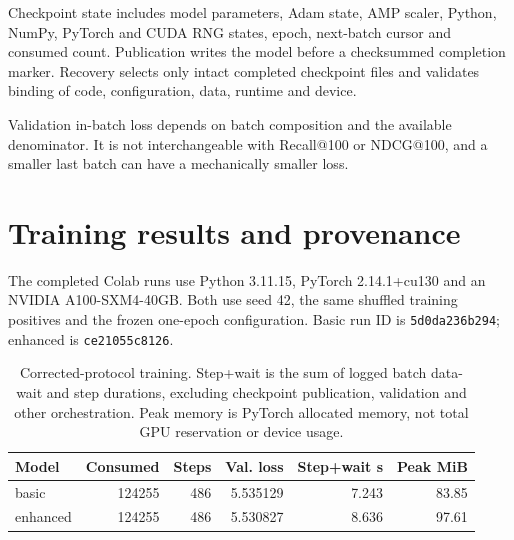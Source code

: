 \documentclass[11pt,a4paper]{article}
\begin{document}
Checkpoint state includes model parameters, Adam state, AMP scaler, Python, NumPy, PyTorch and CUDA RNG states, epoch, next-batch cursor and consumed count. Publication writes the model before a checksummed completion marker. Recovery selects only intact completed checkpoint files and validates binding of code, configuration, data, runtime and device.

Validation in-batch loss depends on batch composition and the available denominator. It is not interchangeable with Recall@100 or NDCG@100, and a smaller last batch can have a mechanically smaller loss.
\clearpage
\section{Training results and provenance}
The completed Colab runs use Python 3.11.15, PyTorch 2.14.1+cu130 and an NVIDIA A100-SXM4-40GB. Both use seed 42, the same shuffled training positives and the frozen one-epoch configuration. Basic run ID is \texttt{5d0da236b294}; enhanced is \texttt{ce21055c8126}.
\begin{table}[H]\centering\small\begin{tabular}{lrrrrr}\toprule
Model & Consumed & Steps & Val. loss & Step+wait s & Peak MiB\\\midrule
basic & 124255 & 486 & 5.535129 & 7.243 & 83.85 \\
enhanced & 124255 & 486 & 5.530827 & 8.636 & 97.61 \\
\bottomrule\end{tabular}
\caption{Corrected-protocol training. Step+wait is the sum of logged batch data-wait and step durations, excluding checkpoint publication, validation and other orchestration. Peak memory is PyTorch allocated memory, not total GPU reservation or device usage.}\end{table}
\end{document}
